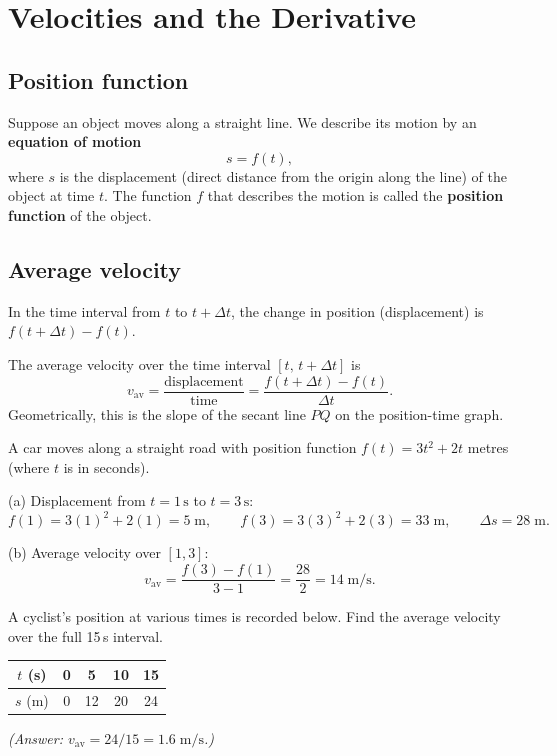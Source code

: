 \section{Velocities and the Derivative}

\subsection{Position function}

Suppose an object moves along a straight line. We describe its motion by an \textbf{equation of motion}
\[
  s = f(t),
\]
where $s$ is the displacement (direct distance from the origin along the line) of the object
at time $t$. The function $f$ that describes the motion is called the \textbf{position function}
of the object.

\subsection{Average velocity}

In the time interval from $t$ to $t+\Delta t$, the change in position (displacement) is
$f(t+\Delta t)-f(t)$.

\begin{keybox}
The average velocity over the time interval $[t,\,t+\Delta t]$ is
\[
  v_\text{av} = \frac{\text{displacement}}{\text{time}} = \frac{f(t+\Delta t)-f(t)}{\Delta t}.
\]
Geometrically, this is the slope of the secant line $PQ$ on the position-time graph.
\end{keybox}

\begin{workedexample}
A car moves along a straight road with position function $f(t)=3t^2+2t$ metres (where
$t$ is in seconds).

(a) Displacement from $t=1\,\text{s}$ to $t=3\,\text{s}$:
\[
  f(1)=3(1)^2+2(1)=5\;\text{m}, \qquad f(3)=3(3)^2+2(3)=33\;\text{m}, \qquad \Delta s=28\;\text{m}.
\]

(b) Average velocity over $[1,3]$:
\[
  v_\text{av} = \frac{f(3)-f(1)}{3-1} = \frac{28}{2} = 14\;\text{m/s}.
\]
\end{workedexample}

\begin{tryit}
A cyclist's position at various times is recorded below. Find the average velocity over
the full 15\,s interval.
\begin{center}
\begin{tabular}{ccccc}
  \toprule
  $t$ (s) & 0 & 5 & 10 & 15 \\
  \midrule
  $s$ (m) & 0 & 12 & 20 & 24 \\
  \bottomrule
\end{tabular}
\end{center}
\textit{(Answer: $v_\text{av}=24/15=1.6\;\text{m/s}$.)}
\end{tryit}

